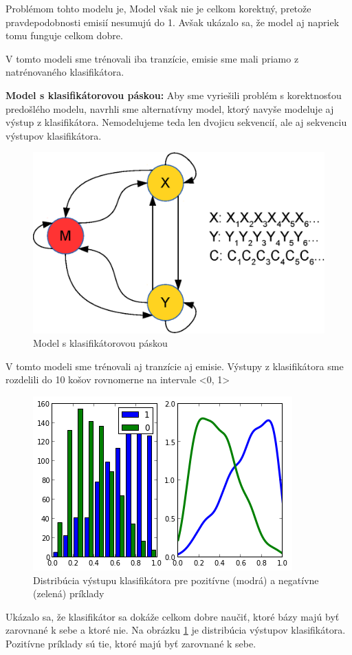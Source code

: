\documentclass{svk_short_sk}
\begin{document}
Problémom tohto modelu je, Model však nie je celkom korektný, pretože pravdepodobnosti emisií nesumujú do 1. Avšak ukázalo sa, že model aj napriek tomu funguje celkom dobre.

V tomto modeli sme trénovali iba tranzície, emisie sme mali priamo z natrénovaného klasifikátora.

\textbf{Model s klasifikátorovou páskou:}
Aby sme vyriešili problém s korektnosťou predošlého modelu, navrhli sme alternatívny model, ktorý navyše modeluje aj výstup z klasifikátora.
Nemodelujeme teda len dvojicu sekvencií, ale aj sekvenciu výstupov klasifikátora.

\begin{figure}[htp]
    \centering
    \includegraphics[width=.3\textwidth]{images/model_clf_paska}
    \caption{Model s klasifikátorovou páskou}
\end{figure}

V tomto modeli sme trénovali aj tranzície aj emisie. Výstupy z klasifikátora sme rozdelili do 10 košov rovnomerne na intervale <0, 1>

\begin{figure}[htp]
    \centering
    \includegraphics[width=.3\textwidth]{images/clf_m_test}
    \caption{Distribúcia výstupu klasifikátora pre pozitívne (modrá) a negatívne (zelená) príklady}
    \label{fig:clf-m-dist}
\end{figure}

Ukázalo sa, že klasifikátor sa dokáže celkom dobre naučiť, ktoré bázy majú byť zarovnané k sebe a ktoré nie. Na obrázku \ref{fig:clf-m-dist} je distribúcia výstupov klasifikátora. Pozitívne príklady sú tie, ktoré majú byť zarovnané k sebe.

\nocite{*}



\end{document}
